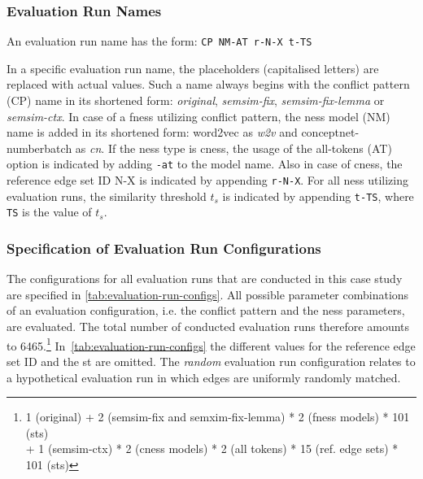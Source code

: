 \documentclass[11pt]{scrreprt}
\begin{document}
{\subsubsection{Evaluation Run Names}
\label{sec:eval-run-names}
An evaluation run name has the form: \texttt{CP NM-AT r-N-X t-TS}

In a specific evaluation run name, the placeholders (capitalised letters) are replaced with actual values. Such a name always begins with the conflict pattern (CP) name in its shortened form: \textit{original}, \textit{semsim-fix}, \textit{semsim-fix-lemma} or \textit{semsim-ctx}. In case of a \gls{fness} utilizing conflict pattern, the \gls{ness} model (NM) name is added in its shortened form: word2vec as \textit{w2v} and conceptnet-numberbatch as \textit{cn}. If the \gls{ness} type is \gls{cness}, the usage of the all-tokens (AT) option is indicated by adding \texttt{-at} to the model name. Also in case of \gls{cness}, the reference edge set ID N-X is indicated by appending \texttt{r-N-X}. For all \gls{ness} utilizing evaluation runs, the similarity threshold \(t_s\) is indicated by appending \texttt{t-TS}, where \texttt{TS} is the value of \(t_s\).



\subsubsection{Specification of Evaluation Run Configurations}
\label{sec:evaluation-configurations}
The configurations for all evaluation runs that are conducted in this case study are specified in \cref{tab:evaluation-run-configs}. All possible parameter combinations of an evaluation configuration, i.e. the conflict pattern and the \gls{ness} parameters, are evaluated. The total number of conducted evaluation runs therefore amounts to 6465.\footnote{1 (original) + 2 (semsim-fix and semxim-fix-lemma) * 2 (\gls{fness} models) * 101 (\gls{st}s) \\ + 1 (semsim-ctx) * 2 (\gls{cness} models) * 2 (all tokens) * 15 (ref. edge sets) * 101 (\gls{st}s)} In \cref{tab:evaluation-run-configs} the different values for the reference edge set ID and the \gls{st} are omitted. The \textit{random} evaluation run configuration relates to a hypothetical evaluation run in which edges are uniformly randomly matched. 


}
\end{document}
